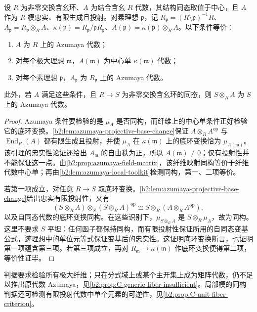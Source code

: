 \begin{theorem}\label{b2:thm:azumaya-fiber-criterion}
	设 \(R\) 为非零交换含幺环、\(A\) 为结合含幺 \(R\) 代数，其结构同态取值于中心，且 \(A\) 作为 \(R\) 模忠实、有限生成且投射。对素理想 \(\mathfrak p\)，记 \(R_{\mathfrak p}=(R\setminus\mathfrak p)^{-1}R\)、\(A_{\mathfrak p}=R_{\mathfrak p}\otimes_RA\)、\(\kappa(\mathfrak p)=R_{\mathfrak p}/\mathfrak pR_{\mathfrak p}\)、\(A(\mathfrak p)=\kappa(\mathfrak p)\otimes_RA\)。以下条件等价：
	\begin{enumerate}
		\item \(A\) 为 \(R\) 上的 Azumaya 代数；
		\item 对每个极大理想 \(\mathfrak m\)，\(A(\mathfrak m)\) 为中心单 \(\kappa(\mathfrak m)\) 代数；
		\item 对每个素理想 \(\mathfrak p\)，\(A_{\mathfrak p}\) 为 \(R_{\mathfrak p}\) 上的 Azumaya 代数。
	\end{enumerate}
	此外，若 \(A\) 满足这些条件，且 \(R\to S\) 为非零交换含幺环的同态，则 \(S\otimes_RA\) 为 \(S\) 上的 Azumaya 代数。
\end{theorem}
\begin{proof}
	Azumaya 条件要检验的是 \(\mu_A\) 是否同构，而纤维上的中心单条件正好检验它的底环变换。\cref{b2:lem:azumaya-projective-base-change}保证 \(A\otimes_RA^{\mathrm{op}}\) 与 \(\operatorname{End}_R(A)\) 都有限生成且投射，并使 \(\mu_A\) 在 \(\kappa(\mathfrak m)\) 上的底环变换恰为 \(\mu_{A(\mathfrak m)}\)。该引理的忠实性论证还给出 \(A_{\mathfrak m}\) 的自由秩为正，所以 \(A(\mathfrak m)\ne0\)；仅有投射性并不能保证这一点。由\cref{b2:prop:azumaya-field-matrix}，该纤维映射同构等价于纤维代数中心单；再由\cref{b2:lem:azumaya-local-toolkit}检测同构，第一、二项等价。

	若第一项成立，对任意 \(R\rightarrow S\) 取底环变换。\cref{b2:lem:azumaya-projective-base-change}给出忠实有限投射性，又有
	\[
		(S\otimes_RA)\otimes_S(S\otimes_RA)^{\mathrm{op}} \cong S\otimes_R(A\otimes_RA^{\mathrm{op}}),
	\]
	以及自同态代数的底环变换同构。在这些识别下，\(\mu_{S\otimes_RA}\) 是 \(S\otimes_R\mu_A\)，故为同构。这里不要求 \(S\) 平坦：任何函子都保持同构，而有限投射性保证所用的自同态变基公式，迹理想中的单位元等式保证变基后的忠实性。这证明底环变换断言，也证明第一项蕴含第三项。若第三项成立，再对 \(R_{\mathfrak m}\rightarrow\kappa(\mathfrak m)\) 作底环变换便得第二项，等价性证毕。
\end{proof}

判据要求检验所有极大纤维；只在分式域上或某个主开集上成为矩阵代数，仍不足以推出原代数 Azumaya，见\cref{b2:prop:C-generic-fiber-insufficient}。局部模的同构判据还可检测有限投射代数中单个元素的可逆性，见\cref{b2:prop:C-unit-fiber-criterion}。


